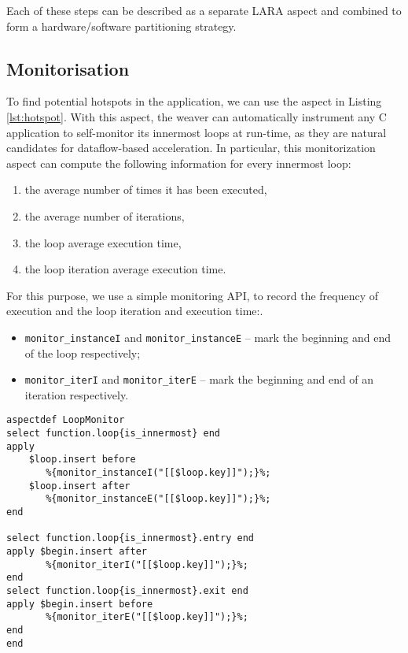 Each of these steps can be described as a separate LARA aspect and
combined to form a hardware/software partitioning strategy.



\subsection{Monitorisation}
\label{sect:asp_mon}
To find potential hotspots in the application, we can use the aspect
in Listing \ref{lst:hotspot}.  With this aspect, the weaver can
automatically instrument any C application to self-monitor its
innermost loops at run-time, as they are natural candidates for
dataflow-based acceleration. In particular, this monitorization aspect
can compute the following information for every innermost loop:
\begin{enumerate}
\item the average number of times it has been executed,
\item the average number of iterations,
\item the loop average execution time,
\item the loop iteration average execution time.
\end{enumerate}

For this purpose, we use a simple monitoring API, to record the
frequency of execution and the loop iteration and execution time:.
\begin{itemize}
\item \texttt{monitor\_instanceI} and \texttt{monitor\_instanceE} -- mark
  the beginning and end of the loop respectively;
\item \texttt{monitor\_iterI} and \texttt{monitor\_iterE} -- mark the
  beginning and end of an iteration respectively.
\end{itemize}

\lstset{style=lara}
\begin{lstlisting}[caption={Aspect that instruments the application to monitor loop
  activity. The information generated can be used to identify
  hotspots.}, label={lst:hotspot}]
aspectdef LoopMonitor
select function.loop{is_innermost} end
apply
    $loop.insert before
       %{monitor_instanceI("[[$loop.key]]");}%;
    $loop.insert after
       %{monitor_instanceE("[[$loop.key]]");}%;
end

select function.loop{is_innermost}.entry end
apply $begin.insert after
       %{monitor_iterI("[[$loop.key]]");}%;
end
select function.loop{is_innermost}.exit end
apply $begin.insert before
       %{monitor_iterE("[[$loop.key]]");}%;
end
end
\end{lstlisting}

